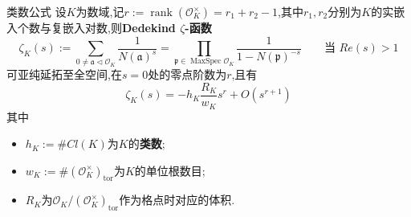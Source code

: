 \documentclass[pdf]{beamer}
\numberwithin{equation}{section}
\theoremstyle{plain}
\theoremstyle{plain}
\theoremstyle{plain}
\theoremstyle{remark}
\DeclareMathOperator{\rank}{\operatorname{rank}}
\DeclareMathOperator{\tor}{\operatorname{tor}}
\newcommand{\MaxSpec}{\operatorname{MaxSpec}}
\begin{document}
\begin{frame}[fragile]{类数公式}
	\hspace*{20pt}设$K$为数域,记$r:=\rank (\mathcal{O}_K^{\times})=r_1+r_2-1$,其中$r_1,r_2$分别为$K$的实嵌入个数与复嵌入对数,则\textbf{Dedekind $\zeta$-函数}
	$$\zeta_K(s):=\sum_{0 \neq \mathfrak{a} \vartriangleleft \mathcal{O}_K}\frac{1}{N(\mathfrak{a})^{s}}=\prod_{\mathfrak{p} \in \MaxSpec \mathcal{O}_K} \frac{1}{1-N(\mathfrak{p})^{-s}} \qquad \text{当 }Re(s)>1 $$
	可亚纯延拓至全空间,在$s=0$处的零点阶数为$r$,且有
	$$\zeta_K(s)=-h_K\frac{R_K}{w_K}s^r+O(s^{r+1})$$
	其中
	\begin{itemize}
		\item $h_K:=\#Cl(K)$为$K$的\textbf{类数};
		\item $w_K:=\#(\mathcal{O}_K^{\times})_{\tor}$为$K$的单位根数目;
		\item $R_K$为$\mathcal{O}_K/(\mathcal{O}_K^{\times})_{\tor}$作为格点时对应的体积.
	\end{itemize}
\end{frame}
\end{document}
